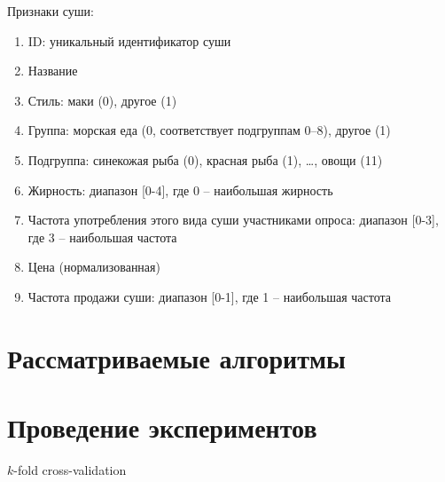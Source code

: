 		\noindent Признаки суши:
		\vspace{-0.7em}
		\begin{enumerate}[itemsep=-1.5mm]
			\item ID: уникальный идентификатор суши
			\item Название
			\item Стиль: маки (0), другое (1)
			\item Группа: морская еда (0, соответствует подгруппам 0--8), другое (1)
			\item Подгруппа: синекожая рыба (0), красная рыба (1), \dots, овощи (11) 
			\item Жирность: диапазон [0-4], где 0 -- наибольшая жирность
			\item Частота употребления этого вида суши участниками опроса: диапазон [0-3], где 3 -- наибольшая частота
			\item Цена (нормализованная)
			\item Частота продажи суши: диапазон [0-1], где 1 -- наибольшая частота
		\end{enumerate}
		
\section{Рассматриваемые алгоритмы}

\section{Проведение экспериментов}

$k$-fold cross-validation

